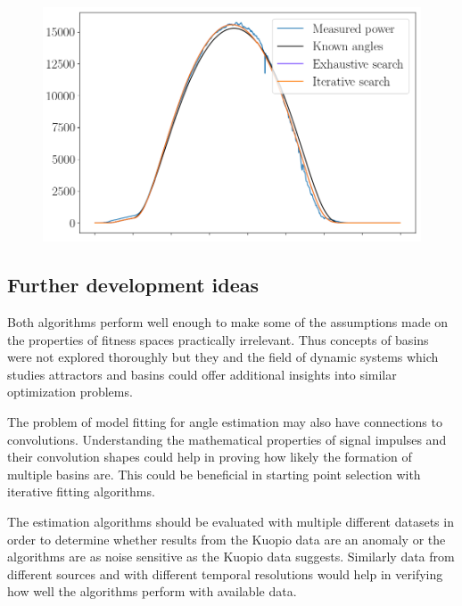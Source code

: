 \begin{figure}[!h]
\centering
\includegraphics[width=0.8\linewidth]{pics/measured_vs_simulated_vs_kuopio}
\label{measured_vs_simulated_vs_estimated_kuopio}
\end{figure}

\pagebreak
\pagebreak

\subsection{Further development ideas}
Both algorithms perform well enough to make some of the assumptions made on the properties of fitness spaces practically irrelevant. Thus concepts of basins were not explored thoroughly but they and the field of dynamic systems which studies attractors and basins could offer additional insights into similar optimization problems.

The problem of model fitting for angle estimation may also have connections to convolutions. Understanding the mathematical properties of signal impulses and their convolution shapes could help in proving how likely the formation of multiple basins are. This could be beneficial in starting point selection with iterative fitting algorithms.

The estimation algorithms should be evaluated with multiple different datasets in order to determine whether results from the Kuopio data are an anomaly or the algorithms are as noise sensitive as the Kuopio data suggests. Similarly data from different sources and with different temporal resolutions would help in verifying how well the algorithms perform with available data.








